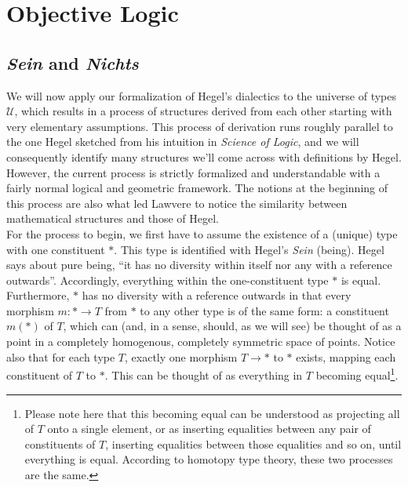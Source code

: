\documentclass{article}
\begin{document}
\section{Objective Logic}
\subsection{\emph{Sein} and \emph{Nichts}}
We will now apply our formalization of Hegel's dialectics to the universe of types $\mathcal{U}$, which
results in a process of structures derived from each other starting with very elementary assumptions.
This process of derivation runs roughly parallel to the one Hegel sketched from his intuition in \emph{Science
of Logic}, and we will consequently identify many structures we'll come across with definitions by Hegel.
However, the current process is strictly formalized and understandable with a fairly normal logical and
geometric framework. The notions at the beginning of this process are also what led Lawvere to notice
the similarity between mathematical structures and those of Hegel. \\

For the process to begin, we first have to assume the existence of a (unique) type with one constituent
$*$. This type is identified with Hegel's \emph{Sein} (being). Hegel says about pure being, ``it has no
diversity within itself nor any with a reference outwards''. Accordingly, everything within the one-constituent
type $*$ is equal. Furthermore, $*$ has no diversity with a reference outwards in that every morphism
$m:*\rightarrow T$ from $*$ to any other type is of the same form: a constituent $m(*)$ of $T$, which
can (and, in a sense, should, as we will see) be thought of as a point in a completely homogenous, completely
symmetric space of points. Notice also that for each type $T$, exactly one morphism $T\rightarrow *$ to
$*$ exists, mapping each constituent of $T$ to $*$. This can be thought of as everything in $T$ becoming
equal\footnote{Please note here that this becoming equal can be understood as projecting all of $T$ onto
a single element, or as inserting equalities between any pair of constituents of $T$, inserting equalities
between those equalities and so on, until everything is equal. According to homotopy type theory, these
two processes are the same.}. \\ 
\end{document}
